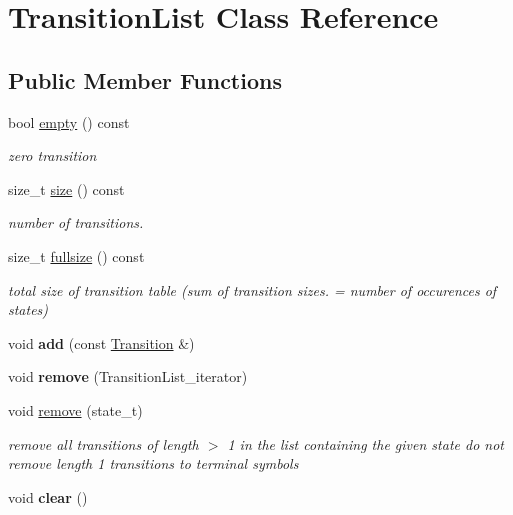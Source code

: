 \hypertarget{classTransitionList}{}\section{Transition\+List Class Reference}
\label{classTransitionList}
\subsection*{Public Member Functions}
\begin{DoxyCompactItemize}
\item 
bool \mbox{\hyperlink{group__schemata_gaba83dbc74a223a80ad7f8776847bd6c2}{empty}} () const
\begin{DoxyCompactList}\small\item\em zero transition \end{DoxyCompactList}\item 
size\+\_\+t \mbox{\hyperlink{group__schemata_gaa719dbdab17047360e889910795a07f2}{size}} () const
\begin{DoxyCompactList}\small\item\em number of transitions. \end{DoxyCompactList}\item 
\mbox{\label{classTransitionList_a895b21c1601aa0227264856f534f3714}} 
size\+\_\+t \mbox{\hyperlink{classTransitionList_a895b21c1601aa0227264856f534f3714}{fullsize}} () const
\begin{DoxyCompactList}\small\item\em total size of transition table (sum of transition sizes. = number of occurences of states) \end{DoxyCompactList}\item 
void {\bfseries add} (const \mbox{\hyperlink{classTransition}{Transition}} \&)
\item 
void {\bfseries remove} (Transition\+List\+\_\+iterator)
\item 
void \mbox{\hyperlink{group__schemata_ga3c5b906f3ce72168effc16b06ed1ef6c}{remove}} (state\+\_\+t)
\begin{DoxyCompactList}\small\item\em remove all transitions of length $>$ 1 in the list containing the given state do not remove length 1 transitions to terminal symbols \end{DoxyCompactList}\item 
void {\bfseries clear} ()
\item 

\end{DoxyCompactItemize}
